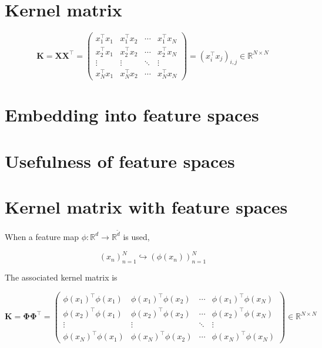 \section*{Kernel matrix}
$$
\mathbf{K}=\mathbf{X} \mathbf{X}^{\top}=\left(\begin{array}{cccc}
x_{1}^{\top} x_{1} & x_{1}^{\top} x_{2} & \cdots & x_{1}^{\top} x_{N} \\
x_{2}^{\top} x_{1} & x_{2}^{\top} x_{2} & \cdots & x_{2}^{\top} x_{N} \\
\vdots & \vdots & \ddots & \vdots \\
x_{N}^{\top} x_{1} & x_{N}^{\top} x_{2} & \cdots & x_{N}^{\top} x_{N}
\end{array}\right)=\left(x_{i}^{\top} x_{j}\right)_{i, j} \in \mathbb{R}^{N \times N}
$$

\section*{Embedding into feature spaces}


\section*{Usefulness of feature spaces}


\section*{Kernel matrix with feature spaces}
When a feature map $\phi: \mathbb{R}^{d} \rightarrow \mathbb{R}^{\tilde{d}}$ is used,

$$
\left(x_{n}\right)_{n=1}^{N} \hookrightarrow\left(\phi\left(x_{n}\right)\right)_{n=1}^{N}
$$

The associated kernel matrix is

$$
\mathbf{K}=\boldsymbol{\Phi} \boldsymbol{\Phi}^{\top}=\left(\begin{array}{cccc}
\phi\left(x_{1}\right)^{\top} \phi\left(x_{1}\right) & \phi\left(x_{1}\right)^{\top} \phi\left(x_{2}\right) & \cdots & \phi\left(x_{1}\right)^{\top} \phi\left(x_{N}\right) \\
\phi\left(x_{2}\right)^{\top} \phi\left(x_{1}\right) & \phi\left(x_{2}\right)^{\top} \phi\left(x_{2}\right) & \cdots & \phi\left(x_{2}\right)^{\top} \phi\left(x_{N}\right) \\
\vdots & \vdots & \ddots & \vdots \\
\phi\left(x_{N}\right)^{\top} \phi\left(x_{1}\right) & \phi\left(x_{N}\right)^{\top} \phi\left(x_{2}\right) & \cdots & \phi\left(x_{N}\right)^{\top} \phi\left(x_{N}\right)
\end{array}\right) \in \mathbb{R}^{N \times N}
$$

